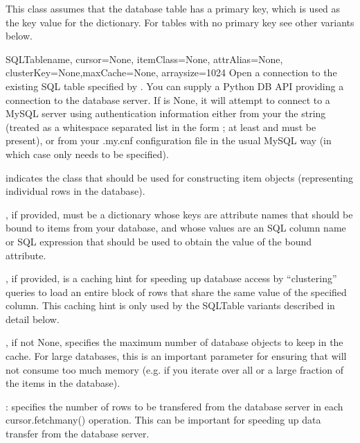 \documentclass{howto}
\begin{document}
This class assumes that the database table has a primary key,
which is used as the key value for the dictionary.  For tables
with no primary key see other variants below.

\begin{funcdesc}{SQLTable}{name, cursor=None, itemClass=None, attrAlias=None, clusterKey=None,maxCache=None, arraysize=1024}
  Open a connection to the existing SQL table specified by .
  You can supply a Python DB API  providing a connection
  to the database server.  If  is None, it will attempt
  to connect to a MySQL server using authentication information either
  from your the  string (treated as a whitespace separated
  list in the form    ;
  at least  and  must be present), or from your 
  .my.cnf configuration file in the usual MySQL way (in which case only
   needs to be specified).

   indicates 
  the class that should be used for constructing item objects (representing
  individual rows in the database).

  , if provided, must be a dictionary whose keys are
  attribute names that should be bound to items from your database,
  and whose values are an SQL column name or SQL expression that should
  be used to obtain the value of the bound attribute.

  , if provided, is a caching hint for speeding up
  database access by ``clustering'' queries to load an entire block
  of rows that share the same value of the specified  column.
  This caching hint is only used by the  SQLTable variants
  described in detail below.

  , if not None, specifies the maximum number of database
  objects to keep in the cache.  For large databases, this is an important
  parameter for ensuring that  will not consume too much
  memory (e.g. if you iterate over all or a large fraction of the items
  in the database).

  : specifies the number of rows to be transfered from the
  database server in each cursor.fetchmany() operation.  This can be important
  for speeding up data transfer from the database server.

\end{funcdesc}
\end{document}
